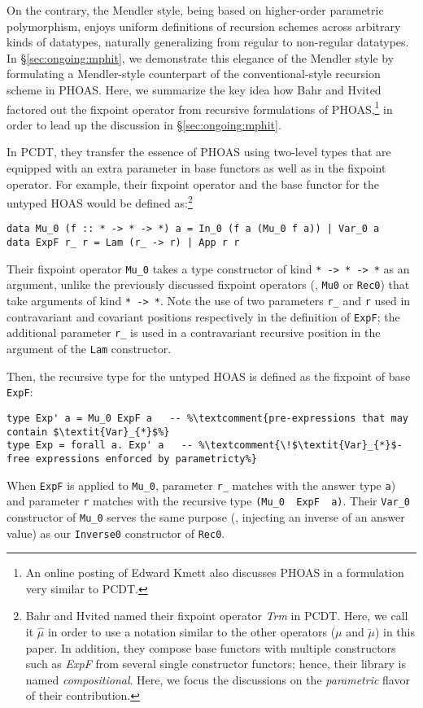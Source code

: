 On the contrary, the Mendler style, being based on higher-order
parametric polymorphism, enjoys uniform definitions of recursion schemes
across arbitrary kinds of datatypes, naturally generalizing from regular
to non-regular datatypes. In \S\ref{sec:ongoing:mphit}, we demonstrate
this elegance of the Mendler style by formulating a Mendler-style counterpart of
the conventional-style recursion scheme in PHOAS. Here, we summarize
the key idea how Bahr and Hvited \cite{BahHvi12} factored out
the fixpoint operator from recursive formulations of PHOAS,\footnote{
	An online posting of Edward Kmett \cite{PHOASforFree}
	also discusses PHOAS in a formulation very similar to PCDT.}
in order to lead up the discussion in \S\ref{sec:ongoing:mphit}.

In PCDT, they transfer the essence of PHOAS using two-level types
that are equipped with an extra parameter in base functors as well as
in the fixpoint operator. For example, their fixpoint operator and
the base functor for the untyped HOAS would be defined as:\footnote{
	Bahr and Hvited named their fixpoint operator \textit{Trm} in PCDT.
	Here, we call it $\hat\mu$ in order to use a notation similar to
	the other operators ($\mu$ and $\breve\mu$) in this paper.
	In addition, they compose base functors with multiple constructors
	such as \textit{ExpF} from several single constructor functors;
	hence, their library is named \emph{compositional}. Here, we focus
	the discussions on the \emph{parametric} flavor of their contribution.}
\begin{lstlisting}
data Mu_0 (f :: * -> * -> *) a = In_0 (f a (Mu_0 f a)) | Var_0 a
data ExpF r_ r = Lam (r_ -> r) | App r r
\end{lstlisting}
Their fixpoint operator \lstinline{Mu_0} takes a type constructor of kind
\lstinline{* -> * -> *} as an argument, unlike the previously discussed
fixpoint operators (\eg, \lstinline{Mu0} or \lstinline{Rec0}) that take
arguments of kind \lstinline{* -> *}. Note the use of two parameters
\lstinline{r_} and \lstinline{r} used in contravariant and covariant positions
respectively in the definition of \lstinline{ExpF}; the additional
parameter \lstinline{r_} is used in a contravariant recursive position
in the argument of the \lstinline{Lam} constructor.

Then, the recursive type for the untyped HOAS is defined as
the fixpoint of base \lstinline{ExpF}:
\begin{lstlisting}
type Exp' a = Mu_0 ExpF a   -- %\textcomment{pre-expressions that may contain $\textit{Var}_{*}$%}
type Exp = forall a. Exp' a   -- %\textcomment{\!$\textit{Var}_{*}$-free expressions enforced by parametricty%}
\end{lstlisting}
When \lstinline{ExpF}
is applied to \lstinline{Mu_0}, parameter \lstinline{r_} matches with
the answer type \lstinline{a}) and parameter \lstinline{r} matches with
the recursive type \lstinline{(Mu_0  ExpF  a)}.
Their \lstinline{Var_0} constructor of \lstinline{Mu_0} serves
the same purpose (\ie, injecting an inverse of an answer value)
as our \lstinline{Inverse0} constructor of \lstinline{Rec0}.

